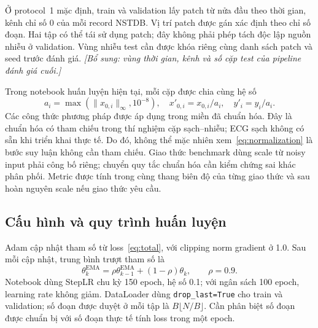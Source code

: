 \documentclass[conference]{IEEEtran}
\newcommand{\draftnote}[1]{\textit{[Bổ sung: #1]}}
\begin{document}
Ở protocol~1 mặc định, train và validation lấy patch từ nửa đầu theo thời gian, kênh chỉ số 0 của mỗi record NSTDB. Vị trí patch được gán xác định theo chỉ số đoạn. Hai tập có thể tái sử dụng patch; đây không phải phép tách độc lập nguồn nhiễu ở validation. Vùng nhiễu test cần được khóa riêng cùng danh sách patch và seed trước đánh giá. \draftnote{vùng thời gian, kênh và số cặp test của pipeline đánh giá cuối.}

Trong notebook huấn luyện hiện tại, mỗi cặp được chia cùng hệ số
\begin{equation}
 a_i=\max(\|x_{0,i}\|_{\infty},10^{-8}),\quad
 x'_{0,i}=x_{0,i}/a_i,\quad y'_i=y_i/a_i.
 \label{eq:normalization}
\end{equation}
Các công thức phương pháp được áp dụng trong miền đã chuẩn hóa. Đây là chuẩn hóa có tham chiếu trong thí nghiệm cặp sạch--nhiễu; ECG sạch không có sẵn khi triển khai thực tế. Do đó, không thể mặc nhiên xem~\eqref{eq:normalization} là bước suy luận không cần tham chiếu. Giao thức benchmark dùng scale từ noisy input phải công bố riêng; chuyển quy tắc chuẩn hóa cần kiểm chứng sai khác phân phối. Metric được tính trong cùng thang biên độ của từng giao thức và sau hoàn nguyên scale nếu giao thức yêu cầu.

\subsection{Cấu hình và quy trình huấn luyện}
Adam cập nhật tham số từ loss~\eqref{eq:total}, với clipping norm gradient ở 1.0. Sau mỗi cập nhật, trung bình trượt tham số là
\begin{equation}
 \theta^{\mathrm{EMA}}_k=\rho\theta^{\mathrm{EMA}}_{k-1}+(1-\rho)\theta_k,
 \qquad\rho=0.9.
\end{equation}
Notebook dùng StepLR chu kỳ 150 epoch, hệ số 0.1; với ngân sách 100 epoch, learning rate không giảm. DataLoader dùng \texttt{drop\_last=True} cho train và validation; số đoạn được duyệt ở mỗi tập là $B\lfloor N/B\rfloor$. Cần phân biệt số đoạn được chuẩn bị với số đoạn thực tế tính loss trong một epoch.
\end{document}
